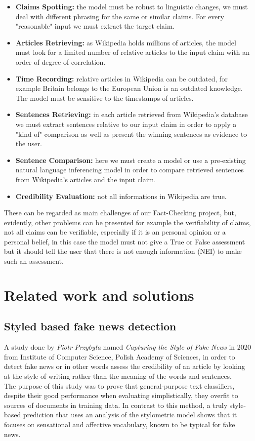 \documentclass[10pt, english]{report}
\begin{document}
\begin{itemize}
	\item \textbf{Claims Spotting:} the model must be robust to linguistic changes, we must deal with different phrasing for the same or similar claims. For every "reasonable" input we must extract the target claim.
	\item \textbf{Articles Retrieving:} as Wikipedia holds millions of articles, the model must look for a limited number of relative articles to the input claim with an order of degree of correlation.
	\item \textbf{Time Recording:} relative articles in Wikipedia can be outdated, for example Britain belongs to the European Union is an outdated knowledge. The model must be sensitive to the timestamps of articles.
	\item \textbf{Sentences Retrieving:}  in each article retrieved from Wikipedia's database we must extract sentences relative to our input claim in order to apply a "kind of" comparison as well as present the winning sentences as evidence to the user.
	\item \textbf{Sentence Comparison:} here we must create a model or use a pre-existing natural language inferencing model in order to compare retrieved sentences from Wikipedia's articles and the input claim. 
	\item \textbf{Credibility Evaluation:} not all informations in Wikipedia are true.
\end{itemize}

These can be regarded as main challenges of our Fact-Checking project, but, evidently, other problems can be presented for example the verifiability of claims, not all claims can be verifiable, especially if it is an personal opinion or a personal belief, in this case the model must not give a True or False assessment but it should tell the user that there is not enough information (NEI) to make such an assessment.

\section{Related work and solutions}
\subsection{Styled based fake news detection \cite{przybyla2020capturing}}
A study done by \textit{Piotr Przybyła} named \textit{Capturing the Style of Fake News} in 2020 from Institute of Computer Science, Polish Academy of Sciences, in order to detect fake news or in other words assess the credibility of an article by looking at the style of writing rather than the meaning of the words and sentences.\\
The purpose of this study was to prove that general-purpose text classifiers, despite their good performance when evaluating simplistically, they overfit to sources of documents in training data. In contrast to this method, a truly style-based prediction that uses an analysis of the stylometric model shows that it focuses on sensational and affective vocabulary, known to be typical for fake news.\\
\end{document}
